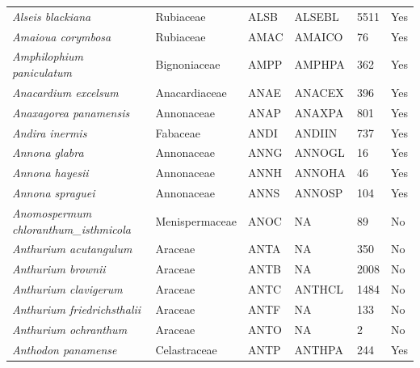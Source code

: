 \documentclass[11pt]{article}
\begin{document}
\begin{longtable}{@{}llllll@{}}
\textit{Alseis blackiana}                             & Rubiaceae        & ALSB   & ALSEBL & 5511            & Yes       \\
\textit{Amaioua corymbosa}                            & Rubiaceae        & AMAC   & AMAICO & 76              & Yes       \\
\textit{Amphilophium paniculatum}                     & Bignoniaceae     & AMPP   & AMPHPA & 362             & Yes       \\
\textit{Anacardium excelsum}                          & Anacardiaceae    & ANAE   & ANACEX & 396             & Yes       \\
\textit{Anaxagorea panamensis}                        & Annonaceae       & ANAP   & ANAXPA & 801             & Yes       \\
\textit{Andira inermis}                               & Fabaceae         & ANDI   & ANDIIN & 737             & Yes       \\
\textit{Annona glabra}                                & Annonaceae       & ANNG   & ANNOGL & 16              & Yes       \\
\textit{Annona hayesii}                               & Annonaceae       & ANNH   & ANNOHA & 46              & Yes       \\
\textit{Annona spraguei}                              & Annonaceae       & ANNS   & ANNOSP & 104             & Yes       \\
\textit{Anomospermum chloranthum\_isthmicola}         & Menispermaceae   & ANOC   & NA     & 89              & No        \\
\textit{Anthurium acutangulum}                        & Araceae          & ANTA   & NA     & 350             & No        \\
\textit{Anthurium brownii}                            & Araceae          & ANTB   & NA     & 2008            & No        \\
\textit{Anthurium clavigerum}                         & Araceae          & ANTC   & ANTHCL & 1484            & No        \\
\textit{Anthurium friedrichsthalii}                   & Araceae          & ANTF   & NA     & 133             & No        \\
\textit{Anthurium ochranthum}                         & Araceae          & ANTO   & NA     & 2               & No        \\
\textit{Anthodon panamense}                           & Celastraceae     & ANTP   & ANTHPA & 244             & Yes       \\

\end{longtable}
\end{document}

